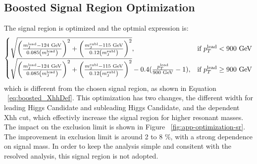 \subsection{Boosted Signal Region Optimization}
\label{sec:app-optimization-sr}
The signal region is optimized and the optmial expression is:
\begin{equation}
\begin{cases}
    \sqrt{\left(\frac{m^{\rm lead}_{\rm J} - \text{124 GeV}}{0.085 \left(m^{\rm lead}_{\rm J}\right)}\right)^2 + \left(\frac{m^{\rm subl}_{\rm J}- \text{115 GeV}}{0.12 \left(m^{\rm subl}_{\rm J}\right)}\right)^2}, & \text{if } p_{T}^{\rm lead} < \text{900 GeV}\\
    \sqrt{\left(\frac{m^{\rm lead}_{\rm J} - \text{124 GeV}}{0.085 \left(m^{\rm lead}_{\rm J}\right)}\right)^2 + \left(\frac{m^{\rm subl}_{\rm J}- \text{115 GeV}}{0.12 \left(m^{\rm subl}_{\rm J}\right)}\right)^2} - 0.4 (\frac{p_{T}^{\rm lead}}{\text{900 GeV}} - 1),              & \text{if } p_{T}^{\rm lead} \geq \text{900 GeV}
\end{cases}
\end{equation}
which is different from the chosen signal region, as shown in Equation ~\ref{eq:boosted_XhhDef}. This optimization has two changes, the different width for leading Higgs Candidate and subleading Higgs Candidate, and the \pt dependent Xhh cut, which effectivly increase the signal region for higher resonant masses. The impact on the exclusion limit is shown in Figure ~\ref{fig:app-optimization-sr}. The improvement in exclusion limit is around 2 to 8 \%, with a strong dependence on signal mass. In order to keep the analysis simple and consitent with the resolved analysis, this signal region is not adopted.


